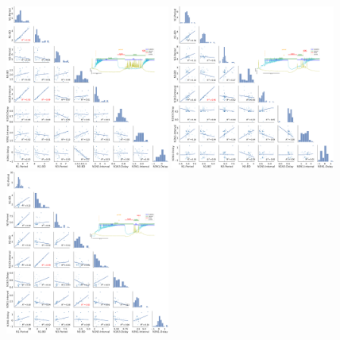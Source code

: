 


\begin{figure}[htbp]
	\centering
	\includegraphics[width=0.48\textwidth]{./invariants/data/SUSSEX/CV1a_driven1/images/2phases/panel_with_pairplot.pdf}
	\includegraphics[width=0.48\textwidth]{./invariants/data/SUSSEX/CV1a_driven2/images/panel_with_pairplot.pdf}
	\includegraphics[width=0.48\textwidth]{./invariants/data/SUSSEX/CV1a_driven3/images/panel_with_pairplot.pdf}

\end{figure}
